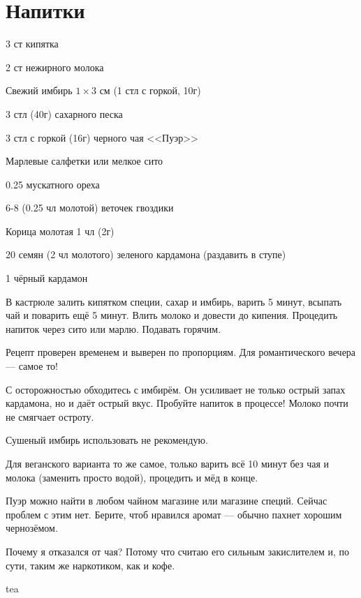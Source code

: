 \chapter*{Напитки}
\label{sec:drinks}


{
\item 3 ст кипятка
\item 2 ст нежирного молока
\item Свежий имбирь $1\times 3$ см (1 стл с горкой, 10г)
\item 3 стл (40г) сахарного песка
\item 3 стл с горкой (16г) черного чая <<Пуэр>>
\item Марлевые салфетки или мелкое сито
}{
\item 0.25 мускатного ореха
\item 6-8 (0.25 чл молотой) веточек гвоздики 
\item Корица молотая 1 чл (2г)
\item 20 семян (2 чл молотого) зеленого кардамона  (раздавить в ступе)  
\item 1 чёрный кардамон 
}{
В кастрюле залить кипятком специи, сахар и имбирь, варить 5 минут, всыпать чай и поварить ещё 5 минут. Влить молоко и довести до кипения. Процедить напиток через сито или марлю. Подавать горячим.
}{
\begin{advice}
\item Рецепт проверен временем и выверен по пропорциям. Для романтического вечера — самое то!
\item С осторожностью обходитесь с имбирём. Он усиливает не только острый запах кардамона, но и даёт острый вкус. Пробуйте напиток в процессе! Молоко почти не смягчает остроту. 
    \item Сушеный имбирь использовать не рекомендую.
    \item Для веганского варианта то же самое, только варить всё 10 минут без чая и молока (заменить просто водой), процедить и мёд в конце.
            \item Пуэр можно найти в любом чайном магазине или магазине специй. Сейчас проблем с этим нет. Берите, чтоб нравился аромат — обычно пахнет хорошим чернозёмом.
                \item Почему я отказался от чая? Потому что считаю его сильным закислителем и, по сути, таким же наркотиком, как и кофе.


\end{advice}}{tea}






